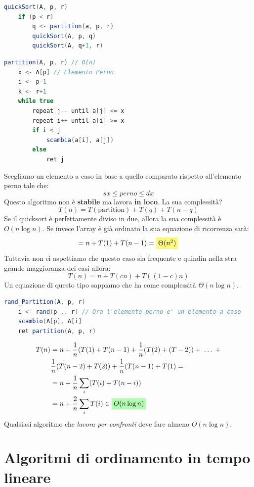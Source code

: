 \documentclass[a4paper]{article}
\begin{document}
\begin{lstlisting}[language=Scala]
quickSort(A, p, r)
    if (p < r) 
        q <- partition(a, p, r)
        quickSort(A, p, q)
        quickSort(A, q+1, r)
\end{lstlisting}

\begin{lstlisting}[language=Scala]
partition(A, p, r) // O(n)
    x <- A[p] // Elemento Perno
    i <- p-1
    k <- r+1
    while true
        repeat j-- until a[j] <= x        
        repeat i++ until a[i] >= x
        if i < j
            scambia(a[i], a[j])
        else
            ret j
\end{lstlisting}
Scegliamo un elemento a caso in base a quello comparato rispetto all'elemento perno tale che:
\[sx \le perno \le dx\]
Questo algoritmo non è \textbf{stabile} ma lavora \textbf{in loco}.
La sua complessità?
\[T(n) = T(\text{partition}) + T(q) + T(n-q)\]
Se il quicksort è perfettamente diviso in due, allora la sua complessità è $O(n \log n)$.
Se invece l'array è già ordinato la sua equazione di ricorrenza sarà:
\[= n + T(1) + T(n-1) = \colorbox{yellow!50!white}{$\Theta(n^2)$}\]
Tuttavia non ci aspettiamo che questo caso sia frequente e quindin nella stra grande maggioranza dei casi allora:
\[T(n) = n + T(cn) + T((1-c)n)\]
Un equazione di questo tipo sappiamo che ha come complessità $\Theta(n \log n)$.
\begin{lstlisting}[language=Scala]
rand_Partition(A, p, r)
    i <- rand(p .. r) // Ora l'elemento perno e' un elemento a caso
    scambio(A[p], A[i]
    ret partition(A, p, r)
\end{lstlisting}

\begin{align*}
    T(n) &= n + \frac{1}{n}(T(1) + T(n-1) + \frac{1}{n}(T(2) + (T-2)) + \; \dots \; + \\ 
    & \frac{1}{n}(T(n-2) + T(2)) + \frac{1}{n}(T(n-1) + T(1) = \\
    &= n + \frac{1}{n} \sum_{i}(T(i) + T(n-i))\\
    &= n + \frac{2}{n} \sum_{i} T(i) \in \colorbox{green!30!white}{$O(n \log n$)}
\end{align*}
Qualsiasi algoritmo che\textit{ lavora per confronti }deve fare almeno $O(n \log n)$. 

\section{Algoritmi di ordinamento in tempo lineare}
\end{document}
